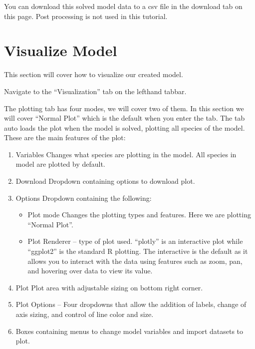 \documentclass[letterpaper,10pt,english]{sphinxmanual}
\begin{document}
\sphinxAtStartPar
You can download this solved model data to a csv file in the
download tab on this page.  Post processing is not used in this tutorial.

\begin{figure}[htbp]
\centering

\noindent{}
\end{figure}


\section{Visualize Model}
\label{\detokenize{pages/tutorial_sc/2_visualize_model:visualize-model}}\label{\detokenize{pages/tutorial_sc/2_visualize_model::doc}}
\sphinxAtStartPar
This section will cover how to visualize our created model.

\sphinxAtStartPar
Navigate to the “Visualization” tab on the lefthand tabbar.

\sphinxAtStartPar
The plotting tab has four modes, we will cover two of them. In this section we
will cover “Normal Plot” which is the default when you enter the tab.
The tab auto loads the plot when the model is solved, plotting all species
of the model. These are the main features of the plot:
\begin{enumerate}
%
\item {} 
\sphinxAtStartPar
Variables \sphinxhyphen{} Changes what species are plotting in the model.
All species in model are plotted by default.

\item {} 
\sphinxAtStartPar
Download \sphinxhyphen{} Dropdown containing options to download plot.

\item {} 
\sphinxAtStartPar
Options \sphinxhyphen{} Dropdown containing the following:
\begin{itemize}
\item {} 
\sphinxAtStartPar
Plot mode \sphinxhyphen{} Changes the plotting types and features.
Here we are plotting “Normal Plot”.

\item {} 
\sphinxAtStartPar
Plot Renderer – type of plot used. “plotly” is an interactive plot while
“ggplot2” is the standard R plotting. The interactive is the default as it
allows you to interact with the data using features such as zoom, pan,
and hovering over data to view its value.

\end{itemize}

\item {} 
\sphinxAtStartPar
Plot \sphinxhyphen{} Plot area with adjustable sizing on bottom right corner.

\item {} 
\sphinxAtStartPar
Plot Options – Four dropdowns that allow the addition of labels,
change of axis sizing, and control of line color and size.

\item {} 
\sphinxAtStartPar
Boxes containing menus to change model variables and import datasets to
plot.

\end{enumerate}
\end{document}
